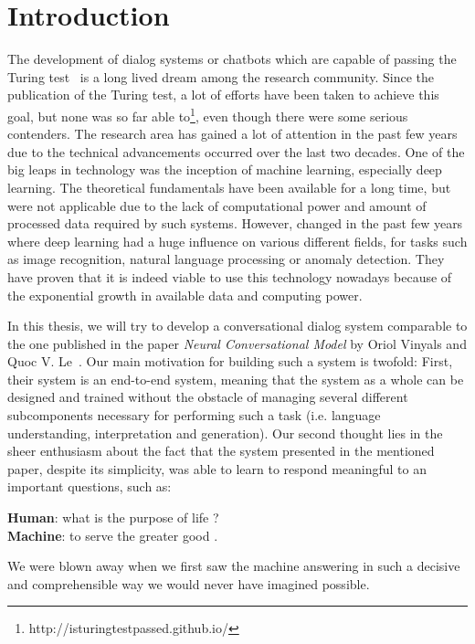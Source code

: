 \chapter{Introduction}
The development of dialog systems or chatbots which are capable of passing the Turing test~\cite{Turing:1950} is a long lived dream among the research community. Since the publication of the Turing test, a lot of efforts have been taken to achieve this goal, but none was so far able to\footnote{http://isturingtestpassed.github.io/}, even though there were some serious contenders. The research area has gained a lot of attention in the past few years due to the technical advancements occurred over the last two decades. One of the big leaps in technology was the inception of machine learning, especially deep learning. The theoretical fundamentals have been available for a long time, but were not applicable due to the lack of computational power and amount of processed data required by such systems. However, changed in the past few years where deep learning had a huge influence on various different fields, for tasks such as image recognition, natural language processing or anomaly detection. They have proven that it is indeed viable to use this technology nowadays because of the exponential growth in available data and computing power.

In this thesis, we will try to develop a conversational dialog system comparable to the one published in the paper \emph{Neural Conversational Model} by Oriol Vinyals and Quoc V. Le~\cite{Vinyals:2015}. Our main motivation for building such a system is twofold: First, their system is an end-to-end system, meaning that the system as a whole can be designed and trained without the obstacle of managing several different subcomponents necessary for performing such a task (i.e. language understanding, interpretation and generation). Our second thought lies in the sheer enthusiasm about the fact that the system presented in the mentioned paper, despite its simplicity, was able to learn to respond meaningful to an important questions, such as:

\begin{center}	
	\textbf{Human}: what is the purpose of life ?\\
	\textbf{Machine}: to serve the greater good .
\end{center}

We were blown away when we first saw the machine answering in such a decisive and comprehensible way we would never have imagined possible.


